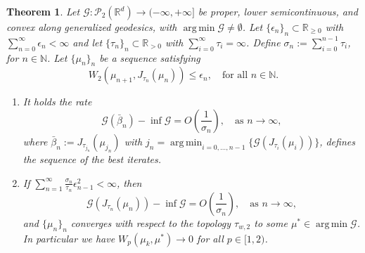 \documentclass[11pt]{article}
\DeclareMathOperator*{\argmin}{arg\,min}
\newtheorem{theorem}{Theorem}[section]
\newcommand{\cP}{\mathcal{P}}
\newcommand{\cG}{\mathcal{G}}
\newcommand{\R}{\mathbb{R}}
\newcommand{\N}{\mathbb{N}}
\newcommand{\RR}{(-\infty,+\infty]}
\numberwithin{equation}{section}
\begin{document}
\begin{theorem}\label{thm:JKO_convergence1}
	Let $\cG : \cP_2(\R^d) \to \RR $ be proper, lower semicontinuous, and convex along generalized geodesics, with $\argmin \cG \neq \emptyset$. Let $\{\epsilon_n\}_n\subset \mathbb{R}_{\geq 0}$ with $\sum_{n=0}^{\infty} \epsilon_n < \infty$ and let $\{\tau_n\}_n \subset \mathbb{R}_{> 0}$ with $\sum_{i=0}^{\infty}\tau_i= \infty$. Define $\sigma_n:= \sum_{i=0}^{n-1}\tau_i$, for $n\in\mathbb{N}$. Let $\{\mu_n\}_n$ be a sequence satisfying
	\[W_2(\mu_{n+1},J_{\tau_n}(\mu_n))\leq \epsilon_n, \quad \text{for all } n \in \N.\]
	\begin{enumerate}
		\item It holds the rate
		\begin{equation}\label{eq:rate_bar1}
			\cG(\bar \beta_n)-\inf \cG = O\left(\frac{1}{\sigma_n}\right), \quad \text{as } n\to \infty,
		\end{equation}
		where $\bar \beta_n := J_{\tau_{j_n}}(\mu_{j_n})$ with $j_n = \argmin_{i=0,\dots,n-1}\{\cG(J_{\tau_i}(\mu_i))\}$, defines the sequence of the best iterates.
		\item If $\sum_{n=1}^{\infty}\frac{\sigma_n}{\tau_n}\epsilon_{n-1}^2  < \infty$, then \[\cG(J_{\tau_n}(\mu_n))-\inf \cG = O\left(\frac{1}{\sigma_n}\right), \quad \text{as } n\to \infty,\] and $\{\mu_n\}_n$ converges with respect to the topology $\tau_{w,2}$ to some $\mu^*\in \argmin \cG$. In particular we have $W_p(\mu_k,\mu^*)\to 0$ for all $p\in[1,2)$.
	\end{enumerate}
\end{theorem}
\end{document}

